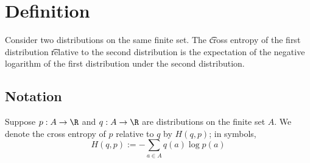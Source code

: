 
\section*{Definition}

Consider two distributions
on the same finite set.
The \t{cross entropy} of the first distribution \t{relative} to the second distribution is the expectation of the negative logarithm of the first distribution under the second distribution.

\subsection*{Notation}

Suppose $p: A \to \R $ and $q: A \to \R $ are distributions on the finite set $A$.
We denote the cross entropy of $p$ relative to $q$ by $H(q, p)$; in symbols,
\[
H(q, p) := -\sum_{a \in A} q(a) \log p(a)
\]

\blankpage